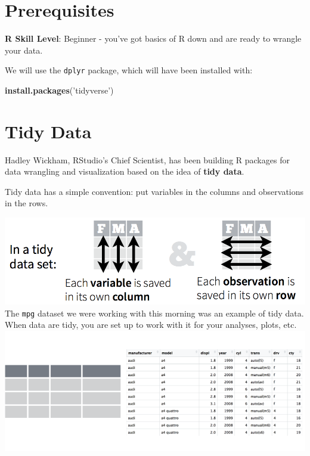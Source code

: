\documentclass[]{book}
\newenvironment{Shaded}{\begin{snugshade}}{\end{snugshade}}
\newcommand{\KeywordTok}[1]{\textcolor[rgb]{0.13,0.29,0.53}{\textbf{{#1}}}}
\newcommand{\StringTok}[1]{\textcolor[rgb]{0.31,0.60,0.02}{{#1}}}
\newcommand{\NormalTok}[1]{{#1}}
\theoremstyle{definition}
\theoremstyle{definition}
\theoremstyle{definition}
\theoremstyle{remark}
\begin{document}
\section{Prerequisites}\label{prerequisites-1}

\textbf{R Skill Level}: Beginner - you've got basics of R down and are
ready to wrangle your data.

We will use the \texttt{dplyr} package, which will have been installed
with:

\begin{Shaded}
\begin{Highlighting}[]
\KeywordTok{install.packages}\NormalTok{(}\StringTok{'tidyverse'}\NormalTok{)}
\end{Highlighting}
\end{Shaded}

\section{Tidy Data}\label{tidy-data}

Hadley Wickham, RStudio's Chief Scientist, has been building R packages
for data wrangling and visualization based on the idea of \textbf{tidy
data}.

Tidy data has a simple convention: put variables in the columns and
observations in the rows.

\includegraphics{img/tidy_data.png} The \texttt{mpg} dataset we were
working with this morning was an example of tidy data. When data are
tidy, you are set up to work with it for your analyses, plots, etc.
\includegraphics{img/tidy_img_mpg.png}
\end{document}
